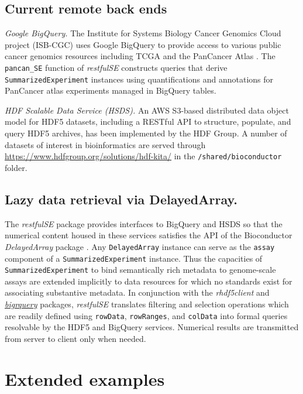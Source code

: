 \documentclass[applications]{gen-bioinformatics}
\newcommand{\Biocpackage}[1]{{\textit{#1}}}
\newcommand{\BiocpackageFirst}[1]{{\textit{#1}}}
\newcommand{\CRANpackageFirst}[1]{{\emph{\href{https://cran.r-project.org/web/packages/#1/index.html}{#1}}}}
\begin{document}
\subsection*{Current remote back ends}

\textit{Google BigQuery.} The Institute for Systems Biology Cancer
Genomics Cloud project (ISB-CGC) \citep{ISBCGC} uses 
Google BigQuery to provide access to
various public cancer genomics resources including
TCGA and the PanCancer Atlas \citep{Hoadley2018}.
The \verb+pancan_SE+
function of \Biocpackage{restfulSE} constructs queries that derive
\texttt{SummarizedExperiment} instances using quantifications and annotations
for PanCancer atlas experiments
managed in BigQuery tables.  

\noindent
\textit{HDF Scalable Data Service (HSDS).}
An AWS S3-based distributed data object model for
HDF5 datasets, including a
RESTful API to structure, populate, and query HDF5 archives, 
has been implemented by the HDF Group. 
A number of datasets of interest in bioinformatics
are served through \url{https://www.hdfgroup.org/solutions/hdf-kita/}
in the \texttt{/shared/bioconductor} folder.

\subsection*{Lazy data retrieval via DelayedArray.}

The \Biocpackage{restfulSE} package provides interfaces to 
BigQuery and HSDS so that 
the numerical content housed in these services
satisfies the API of the Bioconductor \BiocpackageFirst{DelayedArray} package \citep{Pages2018}.  
Any \verb+DelayedArray+ instance can serve as the \verb+assay+
component of a \texttt{SummarizedExperiment} instance.  Thus the
capacities of \verb+SummarizedExperiment+ to bind semantically
rich metadata to genome-scale assays are extended implicitly to
data resources for which no standards exist for
associating substantive metadata.  
In conjunction with the \BiocpackageFirst{rhdf5client} \citep{rclient} and \CRANpackageFirst{bigrquery} \citep{bigr} packages,
\Biocpackage{restfulSE} translates filtering and selection operations
which are readily defined using \verb+rowData+, \verb+rowRanges+,
and \verb+colData+ into formal queries resolvable by the HDF5 and
BigQuery services.  Numerical results are transmitted from
server to client only when needed.

\section*{Extended examples}
\end{document}
